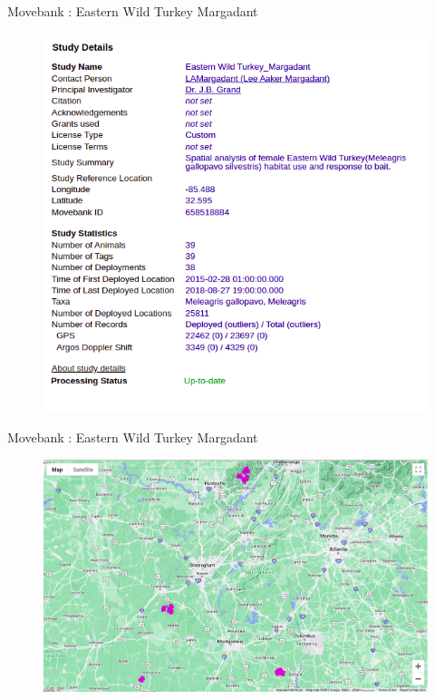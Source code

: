 \documentclass[11pt]{beamer}
\begin{document}
\begin{frame}{Movebank : Eastern Wild Turkey Margadant}

	\begin{figure}
		\includegraphics[scale=1.3]{images/movebank_gallopavo}
	\end{figure}
\end{frame}

\begin{frame}{Movebank : Eastern Wild Turkey Margadant}

	\begin{figure}
		\includegraphics[scale=1]{images/movebank_gallopavo_map}
	\end{figure}
\end{frame}
\end{document}
